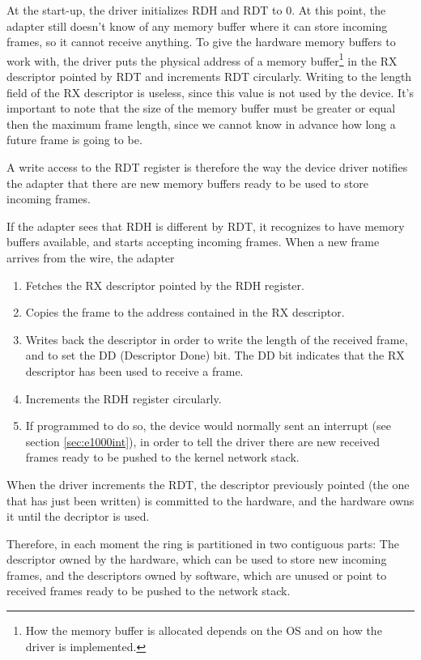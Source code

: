 At the start-up, the driver initializes RDH and RDT to 0. At this point, the adapter still doesn't know of any memory buffer where it
can store incoming frames, so it cannot receive anything.
To give the hardware memory buffers to work with, the driver puts the physical address of a memory buffer\footnote{How the memory 
buffer is allocated depends on the OS and on how the driver is implemented.} in the RX descriptor pointed by RDT and increments 
RDT circularly. Writing to the length field of the RX descriptor is useless, since this value is not used by the device. It's important to note
that the size of the memory buffer must be greater or equal then the maximum frame length, since we cannot know in advance how long
a future frame is going to be.

A write access to the RDT register is therefore the way the device driver notifies the adapter that there are new memory buffers ready
to be used to store incoming frames.

If the adapter sees that RDH is different by RDT, it recognizes to have memory buffers available, and starts accepting incoming frames.
When a new frame arrives from the wire, the adapter
\begin{enumerate}
    \item Fetches the RX descriptor pointed by the RDH register.
    \item Copies the frame to the address contained in the RX descriptor.
    \item Writes back the descriptor in order to write the length of the received frame, and to set the DD (Descriptor Done) bit.
	  The DD bit indicates that the RX descriptor has been used to receive a frame.
    \item Increments the RDH register circularly.
    \item If programmed to do so, the device would normally sent an interrupt (see section \ref{sec:e1000int}), in order to tell
the driver there are new received frames ready to be pushed to the kernel network stack.
\end{enumerate}

When the driver increments the RDT, the descriptor previously pointed (the one that has just been written) is committed to the hardware,
and the hardware owns it until the decriptor is used.

Therefore, in each moment the ring is partitioned in two contiguous parts: The descriptor owned by the hardware, which can be
used to store new incoming frames, and the descriptors owned by software, which are unused or point to received frames ready to
be pushed to the network stack.


